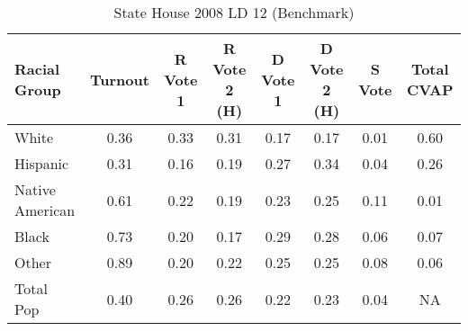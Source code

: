 \begin{table}[htb]
\begin{center}
\caption{State House 2008 LD 12 (Benchmark)}
\label{sthse08_cvap_ld_12}
\begin{tabular}{lccccccc}
  \hline
Racial Group & Turnout & R Vote 1 & R Vote 2 (H) & D Vote 1 & D Vote 2 (H) & S Vote & Total CVAP \\ 
  \hline
 White & 0.36  & 0.33  & 0.31  & 0.17  & 0.17  & 0.01  & 0.60 \\
    Hispanic & 0.31  & 0.16  & 0.19  & 0.27  & 0.34  & 0.04  & 0.26 \\
    Native American & 0.61  & 0.22  & 0.19  & 0.23  & 0.25  & 0.11  & 0.01 \\
    Black & 0.73  & 0.20  & 0.17  & 0.29  & 0.28  & 0.06  & 0.07 \\
    Other & 0.89  & 0.20  & 0.22  & 0.25  & 0.25  & 0.08  & 0.06 \\
    Total Pop & 0.40  & 0.26  & 0.26  & 0.22  & 0.23  & 0.04  & NA \\
   \hline
\end{tabular}
\end{center}
\end{table}
